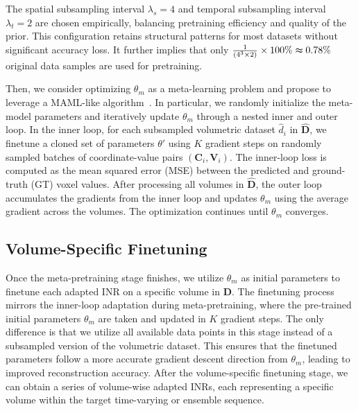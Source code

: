 The spatial subsampling interval $\lambda_s=4$ and temporal subsampling interval $\lambda_t=2$ are chosen empirically, balancing pretraining efficiency and quality of the prior. This configuration retains structural patterns for most datasets without significant accuracy loss.
It further implies that only $\frac{1}{(4^3\times2)}\times100\%\thickapprox0.78\%$ original data samples are used for pretraining.

Then, we consider optimizing $\theta_{m}$ as a meta-learning problem and propose to leverage a MAML-like algorithm~\cite{Finn-ICML17}.
In particular, we randomly initialize the meta-model parameters and iteratively update $\theta_{m}$ through a nested inner and outer loop. In the inner loop, for each subsampled volumetric dataset $\hat{d}_i$ in $\hat{\mathbf{D}}$, we finetune a cloned set of parameters $\theta'$ using $K$ gradient steps on randomly sampled batches of coordinate-value pairs $(\mathbf{C}_i, \mathbf{V}_i)$. The inner-loop loss is computed as the mean squared error (MSE) between the predicted and ground-truth (GT) voxel values. After processing all volumes in $\hat{\mathbf{D}}$, the outer loop accumulates the gradients from the inner loop and updates $\theta_{m}$ using the average gradient across the volumes. The optimization continues until $\theta_{m}$ converges.

\vspace{-0.05in}
\subsection{Volume-Specific Finetuning}
\label{subsec:vsf}

Once the meta-pretraining stage finishes, we utilize $\theta_{m}$ as initial parameters to finetune each adapted INR on a specific volume in $\mathbf{D}$.
%
The finetuning process mirrors the inner-loop adaptation during meta-pretraining, where the pre-trained initial parameters $\theta_{m}$ are taken and updated in $K$ gradient steps. 
The only difference is that we utilize all available data points in this stage instead of a subsampled version of the volumetric dataset.
This ensures that the finetuned parameters follow a more accurate gradient descent direction from $\theta_{m}$, leading to improved reconstruction accuracy.
After the volume-specific finetuning stage, we can obtain a series of volume-wise adapted INRs, each representing a specific volume within the target time-varying or ensemble sequence.
